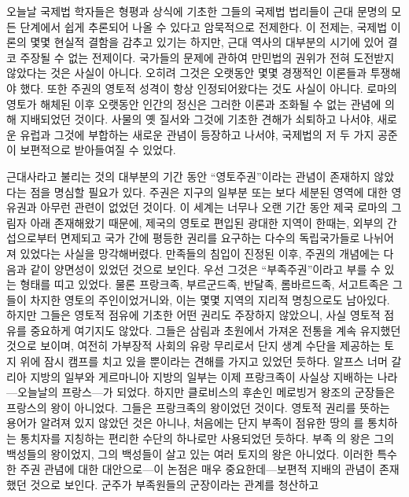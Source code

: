 오늘날 국제법 학자들은
형평과 상식에 기초한
그들의 국제법 법리들이
근대 문명의 모든 단계에서 쉽게 추론되어 나올 수 있다고
암묵적으로 전제한다.
이 전제는, 국제법 이론의 몇몇 현실적 결함을 감추고 있기는 하지만,
근대 역사의 대부분의 시기에 있어 결코 주장될 수 없는 전제이다.
국가들의 문제에 관하여 만민법의 권위가
전혀 도전받지 않았다는 것은 사실이 아니다.
오히려 그것은 오랫동안 몇몇 경쟁적인 이론들과 투쟁해야 했다.
또한 주권의 영토적 성격이 항상 인정되어왔다는 것도 사실이 아니다.
로마의 영토가 해체된 이후 오랫동안 인간의 정신은 그러한 이론과
조화될 수 없는 관념에 의해 지배되었던 것이다.
사물의 옛 질서와 그것에 기초한 견해가 쇠퇴하고 나서야,
새로운 유럽과 그것에 부합하는 새로운 관념이 등장하고 나서야,
국제법의 저 두 가지 공준이 보편적으로 받아들여질 수 있었다.

근대사라고 불리는 것의 대부분의 기간 동안
``영토주권''이라는 관념이
존재하지 않았다는 점을 명심할 필요가 있다.
주권은 지구의 일부분 또는 보다 세분된 영역에 대한 영유권과
아무런 관련이 없었던 것이다.
이 세계는 너무나 오랜 기간 동안 제국 로마의 그림자 아래 존재해왔기 때문에,
제국의 영토로 편입된 광대한 지역이 한때는,
외부의 간섭으로부터 면제되고 국가 간에 평등한 권리를 요구하는
다수의 독립국가들로 나뉘어져 있었다는 사실을 망각해버렸다.
만족들의 침입이 진정된 이후,
주권의 개념에는 다음과 같이 양면성이 있었던 것으로 보인다.
우선 그것은 ``부족주권''이라고 부를 수 있는
형태를 띠고 있었다.
물론
프랑크족, 부르군드족, 반달족, 롬바르드족, 서고트족은
그들이 차지한 영토의 주인이었거니와,
이는 몇몇 지역의 지리적 명칭으로도 남아있다.
하지만 그들은 영토적 점유에 기초한 어떤 권리도 주장하지 않았으니,
사실 영토적 점유를 중요하게 여기지도 않았다.
그들은 삼림과 초원에서 가져온 전통을 계속 유지했던 것으로 보이며,
여전히 가부장적 사회의 유랑 무리로서
단지 생계 수단을 제공하는 토지 위에 잠시
캠프를 치고 있을 뿐이라는 견해를 가지고 있었던 듯하다.
알프스 너머 갈리아 지방의 일부와 게르마니아 지방의 일부는
이제 프랑크족이 사실상 지배하는 나라---오늘날의 프랑스---가 되었다.
하지만 클로비스의 후손인 메로빙거 왕조의 군장들은
프랑스의 왕이 아니었다. 그들은 프랑크족의 왕이었던 것이다.
영토적 권리를 뜻하는 용어가 알려져 있지 않았던 것은 아니나,
처음에는 단지 부족이 점유한 땅의 를
통치하는 통치자를 지칭하는 편리한 수단의 하나로만 사용되었던 듯하다.
부족 의 왕은 그의 백성들의 왕이었지,
그의 백성들이 살고 있는 여러 토지의 왕은 아니었다.
이러한 특수한 주권 관념에 대한
대안으로---이 논점은 매우 중요한데---보편적 지배의 관념이
존재했던 것으로 보인다.
군주가 부족원들의 군장이라는 관계를 청산하고
